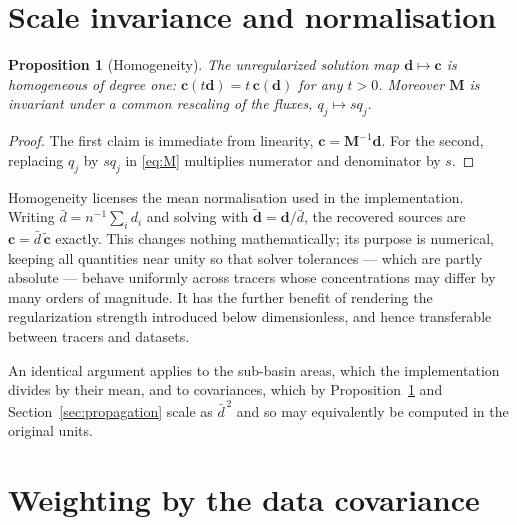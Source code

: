 \documentclass[11pt]{article}
\newcommand{\cvec}{\ensuremath{\mathbf{c}}\xspace}
\newcommand{\dvec}{\ensuremath{\mathbf{d}}\xspace}
\newcommand{\Mmat}{\ensuremath{\mathbf{M}}\xspace}
\newtheorem{theorem}{Proposition}
\theoremstyle{definition}
\begin{document}
\section{Scale invariance and normalisation}
\label{sec:scale}

\begin{theorem}[Homogeneity]\label{prop:homogeneity}
The unregularized solution map $\dvec \mapsto \cvec$ is homogeneous of degree one:
$\cvec(t\dvec) = t\,\cvec(\dvec)$ for any $t > 0$. Moreover $\Mmat$ is invariant under a common
rescaling of the fluxes, $q_j \mapsto sq_j$.
\end{theorem}

\begin{proof}
The first claim is immediate from linearity, $\cvec = \Mmat^{-1}\dvec$. For the second,
replacing $q_j$ by $sq_j$ in \eqref{eq:M} multiplies numerator and denominator by $s$.
\end{proof}

\noindent Homogeneity licenses the mean normalisation used in the implementation. Writing
$\bar{d} = n^{-1}\sum_i d_i$ and solving with $\tilde{\dvec} = \dvec / \bar{d}$, the recovered
sources are $\cvec = \bar{d}\,\tilde{\cvec}$ exactly. This changes nothing mathematically; its
purpose is numerical, keeping all quantities near unity so that solver tolerances --- which are
partly absolute --- behave uniformly across tracers whose concentrations may differ by many
orders of magnitude. It has the further benefit of rendering the regularization strength
introduced below dimensionless, and hence transferable between tracers and datasets.

An identical argument applies to the sub-basin areas, which the implementation divides by their
mean, and to covariances, which by Proposition~\ref{prop:homogeneity} and
Section~\ref{sec:propagation} scale as $\bar{d}^{\,2}$ and so may equivalently be computed in
the original units.

\section{Weighting by the data covariance}
\label{sec:weighting}
\end{document}
